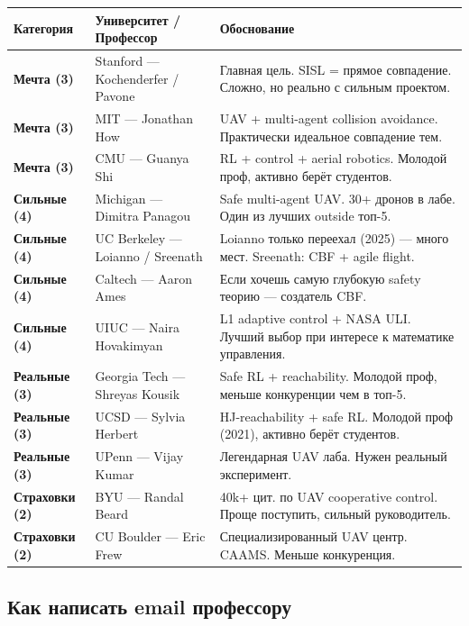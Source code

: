 \documentclass[10pt, a4paper]{article}
\begin{document}
\begin{center}
\begin{tabular}{>{\bfseries}p{2.5cm} p{5.5cm} p{7cm}}
\toprule
Категория & Университет / Профессор & Обоснование \\
\midrule
\rowcolor{lightblue}
Мечта (3) & Stanford — Kochenderfer / Pavone &
  Главная цель. SISL = прямое совпадение. Сложно, но реально с сильным проектом. \\
\rowcolor{lightblue}
Мечта (3) & MIT — Jonathan How &
  UAV + multi-agent collision avoidance. Практически идеальное совпадение тем. \\
\rowcolor{lightblue}
Мечта (3) & CMU — Guanya Shi &
  RL + control + aerial robotics. Молодой проф, активно берёт студентов. \\
\rowcolor{lightgreen}
Сильные (4) & Michigan — Dimitra Panagou &
  Safe multi-agent UAV. 30+ дронов в лабе. Один из лучших outside топ-5. \\
\rowcolor{lightgreen}
Сильные (4) & UC Berkeley — Loianno / Sreenath &
  Loianno только переехал (2025) — много мест. Sreenath: CBF + agile flight. \\
\rowcolor{lightgreen}
Сильные (4) & Caltech — Aaron Ames &
  Если хочешь самую глубокую safety теорию — создатель CBF. \\
\rowcolor{lightgreen}
Сильные (4) & UIUC — Naira Hovakimyan &
  L1 adaptive control + NASA ULI. Лучший выбор при интересе к математике управления. \\
\rowcolor{lightyellow}
Реальные (3) & Georgia Tech — Shreyas Kousik &
  Safe RL + reachability. Молодой проф, меньше конкуренции чем в топ-5. \\
\rowcolor{lightyellow}
Реальные (3) & UCSD — Sylvia Herbert &
  HJ-reachability + safe RL. Молодой проф (2021), активно берёт студентов. \\
\rowcolor{lightyellow}
Реальные (3) & UPenn — Vijay Kumar &
  Легендарная UAV лаба. Нужен реальный эксперимент. \\
\rowcolor{lightorange}
Страховки (2) & BYU — Randal Beard &
  40k+ цит. по UAV cooperative control. Проще поступить, сильный руководитель. \\
\rowcolor{lightorange}
Страховки (2) & CU Boulder — Eric Frew &
  Специализированный UAV центр. CAAMS. Меньше конкуренция. \\
\bottomrule
\end{tabular}
\end{center}

\subsection{Как написать email профессору}
\end{document}
